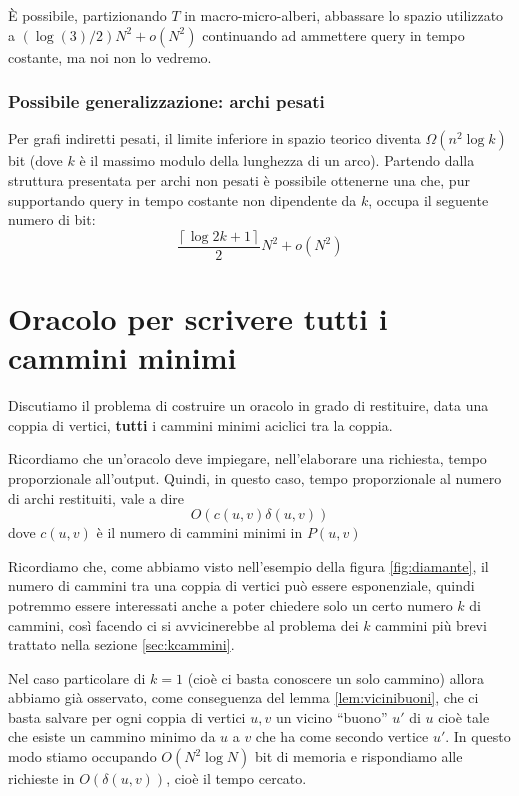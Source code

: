 \documentclass[a4paper,10pt]{amsbook}
\theoremstyle{plain}
\theoremstyle{definition}
\theoremstyle{remark}
\newcommand{\pa}[1]{\left(#1\right)}
\newcommand{\ceil}[1]{\left\lceil#1\right\rceil}
\begin{document}
\`E possibile, partizionando $T$ in macro-micro-alberi, abbassare lo
spazio utilizzato a $\pa{\log\pa{3} /2} N^2 + o(N^2)$ continuando ad
ammettere query in tempo costante, ma noi non lo vedremo.

\subsection{Possibile generalizzazione: archi pesati}

Per grafi indiretti pesati, il limite inferiore in spazio teorico
diventa $\Omega\pa{ n^2 \log k}$ bit (dove $k$ è il massimo modulo
della lunghezza di un arco). Partendo dalla struttura presentata per
archi non pesati \`e possibile ottenerne una che, pur supportando
query in tempo costante non dipendente da $k$, occupa il seguente
numero di bit:
\[ \frac{ \ceil { \log{2k+1} } }{2} N^2 + o(N^2) \]

\chapter{Oracolo per scrivere tutti i cammini minimi}
\label{chap:oracolotutticammini}

Discutiamo il problema di costruire un oracolo in grado di restituire,
data una coppia di vertici, \textbf{tutti} i cammini minimi aciclici
tra la coppia.

Ricordiamo che un'oracolo deve impiegare, nell'elaborare una
richiesta, tempo proporzionale all'output. Quindi, in questo caso,
tempo proporzionale al numero di archi restituiti, vale a dire
\[ O\pa{ c(u,v) \delta (u,v) } \]
dove $c(u,v)$ \`e il numero di cammini minimi in $P(u,v)$

Ricordiamo che, come abbiamo visto nell'esempio della figura
\ref{fig:diamante}, il numero di cammini tra una coppia di vertici
pu\`o essere esponenziale, quindi potremmo essere interessati anche a
poter chiedere solo un certo numero $k$ di cammini, cos\`i facendo ci
si avvicinerebbe al problema dei $k$ cammini pi\`u brevi trattato
nella sezione \ref{sec:kcammini}.

Nel caso particolare di $k=1$ (cio\`e ci basta conoscere un solo
cammino) allora abbiamo gi\`a osservato, come conseguenza del lemma
\ref{lem:vicinibuoni}, che ci basta salvare per ogni coppia di vertici
$u,v$ un vicino ``buono'' $u'$ di $u$ cio\`e tale che esiste un cammino
minimo da $u$ a $v$ che ha come secondo vertice $u'$. In questo modo
stiamo occupando $O\pa{N^2 \log N}$ bit di memoria e rispondiamo alle
richieste in $O\pa{ \delta\pa{u,v}}$, cio\`e il tempo cercato.
\end{document}
